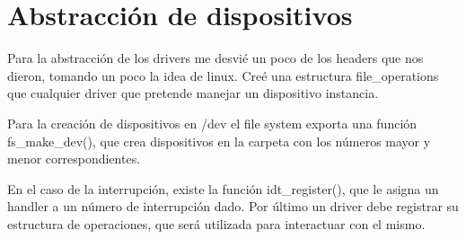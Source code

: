\section{Abstracción de dispositivos}

Para la abstracción de los drivers me desvié un poco de los headers que nos
dieron, tomando un poco la idea de linux. Creé una estructura file\_operations
que cualquier driver que pretende manejar un dispositivo instancia.

Para la creación de dispositivos en /dev el file system exporta una función
fs\_make\_dev(), que crea dispositivos en la carpeta con los números mayor y
menor correspondientes.

En el caso de la interrupción, existe la función idt\_register(), que le asigna
un handler a un número de interrupción dado. Por último un driver debe
registrar su estructura de operaciones, que será utilizada para interactuar
con el mismo.

